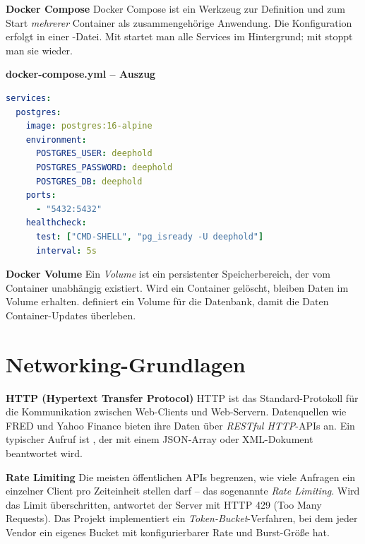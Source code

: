 \begin{definition}
\textbf{Docker Compose}
Docker Compose ist ein Werkzeug zur Definition und zum Start
\emph{mehrerer} Container als zusammengehörige Anwendung. Die
Konfiguration erfolgt in einer -Datei.
Mit  startet man alle Services im
Hintergrund; mit  stoppt man sie wieder.
\end{definition}

\begin{beispiel}
\textbf{docker-compose.yml -- Auszug}
\begin{lstlisting}[language=yaml]
services:
  postgres:
    image: postgres:16-alpine
    environment:
      POSTGRES_USER: deephold
      POSTGRES_PASSWORD: deephold
      POSTGRES_DB: deephold
    ports:
      - "5432:5432"
    healthcheck:
      test: ["CMD-SHELL", "pg_isready -U deephold"]
      interval: 5s
\end{lstlisting}
\end{beispiel}

\begin{definition}
\textbf{Docker Volume}
Ein \emph{Volume} ist ein persistenter Speicherbereich, der vom
Container unabhängig existiert. Wird ein Container gelöscht, bleiben
Daten im Volume erhalten.  definiert ein Volume
 für die Datenbank, damit die Daten
Container-Updates überleben.
\end{definition}

\section{Networking-Grundlagen}

\begin{definition}
\textbf{HTTP (Hypertext Transfer Protocol)}
HTTP ist das Standard-Protokoll für die Kommunikation zwischen
Web-Clients und Web-Servern. Datenquellen wie FRED und Yahoo Finance
bieten ihre Daten über \emph{RESTful HTTP}-APIs an. Ein typischer
Aufruf ist , der mit einem
JSON-Array oder XML-Dokument beantwortet wird.
\end{definition}

\begin{definition}
\textbf{Rate Limiting}
Die meisten öffentlichen APIs begrenzen, wie viele Anfragen ein
einzelner Client pro Zeiteinheit stellen darf -- das sogenannte
\emph{Rate Limiting}. Wird das Limit überschritten, antwortet der
Server mit HTTP 429 (Too Many Requests). Das Projekt implementiert
ein \emph{Token-Bucket}-Verfahren, bei dem jeder Vendor ein eigenes
Bucket mit konfigurierbarer Rate und Burst-Größe hat.
\end{definition}

